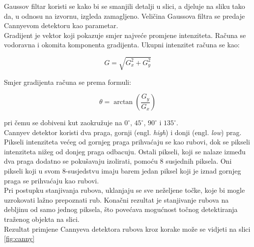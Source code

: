 \documentclass[times, zavrsni, numeric, utf8]{fer}
\begin{document}
Gaussov filtar koristi se kako bi se smanjili detalji u slici, a djeluje na sliku tako da, u odnosu na izvornu, izgleda zamagljeno. Veličina Gaussova filtra se predaje Cannyevom detektoru kao parametar. \\
Gradijent je vektor koji pokazuje smjer najveće promjene intenziteta. Računa se vodoravna i okomita komponenta gradijenta. Ukupni intenzitet računa se kao:
\begin{center}
\begin{equation}
G = \sqrt{G_x^{2} + G_y^{2}}
\end{equation}
\end{center} 
Smjer gradijenta računa se prema formuli:
\begin{center}
\begin{equation}
\theta = \arctan(\frac{G_y}{G_x})
\end{equation}
\end{center}
pri čemu se dobiveni kut zaokružuje na $0^{\circ}$, $45^{\circ}$, $90^{\circ}$ i $135^{\circ}$. \\
Cannyev detektor koristi dva praga, gornji (engl. \textit{high}) i donji (engl. \textit{low}) prag. Pikseli intenziteta većeg od gornjeg praga prihvaćaju se kao rubovi, dok se pikseli intenziteta nižeg od donjeg praga odbacuju. Ostali pikseli, koji se nalaze između dva praga dodatno se pokušavaju izolirati, pomoću 8 susjednih piksela. Oni pikseli koji u svom 8-susjedstvu imaju barem jedan piksel koji je iznad gornjeg praga se prihvaćaju kao rubovi.\\
Pri postupku stanjivanja rubova, uklanjaju se sve neželjene točke, koje bi mogle uzrokovati lažno prepoznati rub. Konačni rezultat je stanjivanje rubova na debljinu od samo jednog piksela, što povećava mogućnost točnog detektiranja traženog objekta na slici. \\
Rezultat primjene Cannyeva detektora rubova kroz korake može se vidjeti na slici \ref{fig:canny}
\end{document}
